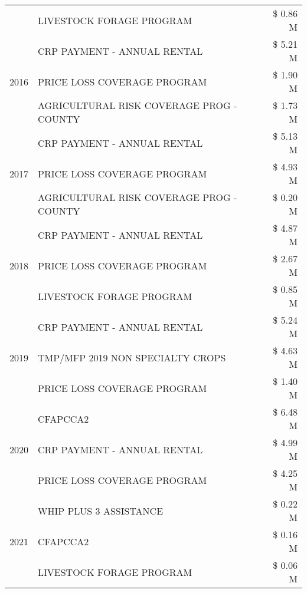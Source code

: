 \begin{tabular}{llr}
 & LIVESTOCK FORAGE PROGRAM & \$ 0.86 M \\
\cline{1-3}
\multirow[t]{3}{*}{2016} & CRP PAYMENT - ANNUAL RENTAL                   & \$ 5.21 M \\
 & PRICE LOSS COVERAGE PROGRAM                   & \$ 1.90 M \\
 & AGRICULTURAL RISK COVERAGE PROG - COUNTY      & \$ 1.73 M \\
\cline{1-3}
\multirow[t]{3}{*}{2017} & CRP PAYMENT - ANNUAL RENTAL & \$ 5.13 M \\
 & PRICE LOSS COVERAGE PROGRAM & \$ 4.93 M \\
 & AGRICULTURAL RISK COVERAGE PROG - COUNTY & \$ 0.20 M \\
\cline{1-3}
\multirow[t]{3}{*}{2018} & CRP PAYMENT - ANNUAL RENTAL & \$ 4.87 M \\
 & PRICE LOSS COVERAGE PROGRAM & \$ 2.67 M \\
 & LIVESTOCK FORAGE PROGRAM & \$ 0.85 M \\
\cline{1-3}
\multirow[t]{3}{*}{2019} & CRP PAYMENT - ANNUAL RENTAL & \$ 5.24 M \\
 & TMP/MFP 2019 NON SPECIALTY CROPS & \$ 4.63 M \\
 & PRICE LOSS COVERAGE PROGRAM & \$ 1.40 M \\
\cline{1-3}
\multirow[t]{3}{*}{2020} & CFAPCCA2 & \$ 6.48 M \\
 & CRP PAYMENT - ANNUAL RENTAL & \$ 4.99 M \\
 & PRICE LOSS COVERAGE PROGRAM & \$ 4.25 M \\
\cline{1-3}
\multirow[t]{3}{*}{2021} & WHIP PLUS 3 ASSISTANCE & \$ 0.22 M \\
 & CFAPCCA2 & \$ 0.16 M \\
 & LIVESTOCK FORAGE PROGRAM & \$ 0.06 M \\
\cline{1-3}
\bottomrule
\end{tabular}
